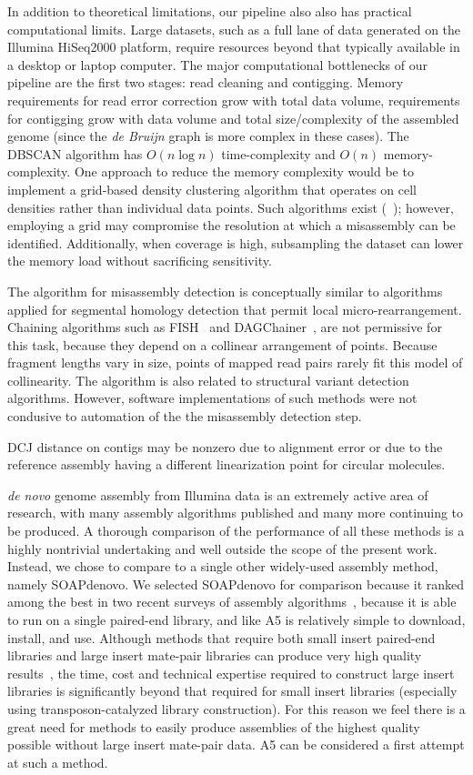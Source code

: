\documentclass{bioinfo}
\begin{document}
In addition to theoretical limitations, our pipeline also also has practical computational limits. Large datasets, such as a full lane of data
generated on the Illumina HiSeq2000 platform, require resources beyond that typically available in a desktop or laptop computer. 
The major computational bottlenecks of our pipeline are the first two stages: read cleaning and contigging. Memory requirements for read error
correction grow with total data volume, requirements for contigging grow with data volume and total size/complexity of the assembled genome 
(since the \textit{de Bruijn} graph is more complex in these cases).
The DBSCAN algorithm has $O(n\log{n})$ time-complexity and $O(n)$ memory-complexity. One 
approach to reduce the memory complexity would be to implement a grid-based density clustering algorithm that operates on cell densities 
rather than individual data points. Such algorithms exist (~\citep{STING}); however, employing a grid may compromise the resolution at which 
a misassembly can be identified. Additionally, when coverage is high, subsampling the dataset can lower the memory load without sacrificing
sensitivity.

The algorithm for misassembly detection is conceptually similar to algorithms applied for segmental homology detection that permit local 
micro-rearrangement. Chaining algorithms such as FISH~\citep{Calabrese2003} and DAGChainer~\citep{Haas2004}, are not permissive for this task, because they depend on a 
collinear arrangement of points. Because fragment lengths vary in size, points of mapped read pairs rarely fit this model of collinearity. 
The algorithm is also related to structural variant detection algorithms. However, software implementations of such methods were not condusive 
to automation of the the misassembly detection step. 

DCJ distance on contigs may be nonzero due to alignment error or due to the reference assembly having a different linearization point
for circular molecules. 

\emph{de novo} genome assembly from Illumina data is an extremely active area of research, with many assembly algorithms published and many more continuing to be produced.
A thorough comparison of the performance of all these methods is a highly nontrivial undertaking and well outside the scope of the present  
work. Instead, we chose to compare to a single other widely-used assembly method, namely SOAPdenovo. We selected SOAPdenovo for comparison
because it ranked among the best in two recent surveys of assembly algorithms~\citep{Earl2011,Salzberg2011}, because it is able to run on a single paired-end
library, and like A5 is relatively simple to download, install, and use. Although methods that require both small insert paired-end libraries
and large insert mate-pair libraries can produce very high quality results~\citep{Gnerre2011}, the time, cost and technical expertise required to construct large insert
libraries is significantly beyond that required for small insert libraries (especially using transposon-catalyzed library construction).
For this reason we feel there is a great need for methods to easily produce assemblies of the highest quality possible without large insert mate-pair data.
A5 can be considered a first attempt at such a method.
\end{document}
